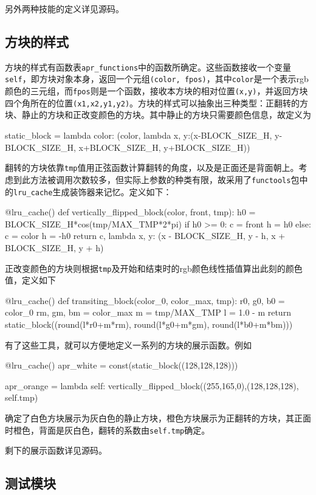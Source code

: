 \documentclass[UTF8]{article}
\begin{document}
另外两种技能的定义详见源码。

\subsection{方块的样式}

方块的样式有函数表\verb|apr_functions|中的函数所确定。这些函数接收一个变量\texttt{self}，即方块对象本身，返回一个元组\texttt{(color, fpos)}，其中\texttt{color}是一个表示rgb颜色的三元组，而\texttt{fpos}则是一个函数，接收本方块的相对位置\texttt{(x,y)}，并返回方块四个角所在的位置\texttt{(x1,x2,y1,y2)}。方块的样式可以抽象出三种类型：正翻转的方块、静止的方块和正改变颜色的方块。其中静止的方块只需要颜色信息，故定义为
\begin{python}
static_block = lambda color: (color, lambda x, y:(x-BLOCK_SIZE_H, y-BLOCK_SIZE_H, x+BLOCK_SIZE_H, y+BLOCK_SIZE_H))
\end{python}
翻转的方块依靠\texttt{tmp}值用正弦函数计算翻转的角度，以及是正面还是背面朝上。考虑到此方法被调用次数较多，但实际上参数的种类有限，故采用了\texttt{functools}包中的\verb|lru_cache|生成装饰器来记忆。定义如下：
\begin{python}
@lru_cache()
def vertically_flipped_block(color, front, tmp):
    h0 = BLOCK_SIZE_H*cos(tmp/MAX_TMP*2*pi)
    if h0 >= 0:
        c = front
        h = h0
    else:
        c = color
        h = -h0
    return c, lambda x, y: (x - BLOCK_SIZE_H, y - h, x + BLOCK_SIZE_H, y + h)
\end{python}
正改变颜色的方块则根据\texttt{tmp}及开始和结束时的rgb颜色线性插值算出此刻的颜色值，定义如下
\begin{python}
@lru_cache()
def transiting_block(color_0, color_max, tmp):
    r0, g0, b0 = color_0
    rm, gm, bm = color_max
    m = tmp/MAX_TMP
    l = 1.0 - m
    return static_block((round(l*r0+m*rm), round(l*g0+m*gm), round(l*b0+m*bm)))
\end{python}

有了这些工具，就可以方便地定义一系列的方块的展示函数。例如
\begin{python}
@lru_cache()
apr_white = const(static_block((128,128,128)))

apr_orange = lambda self: vertically_flipped_block((255,165,0),(128,128,128), self.tmp)
\end{python}
确定了白色方块展示为灰白色的静止方块，橙色方块展示为正翻转的方块，其正面时橙色，背面是灰白色，翻转的系数由\texttt{self.tmp}确定。

剩下的展示函数详见源码。

\subsection{测试模块}
\end{document}
